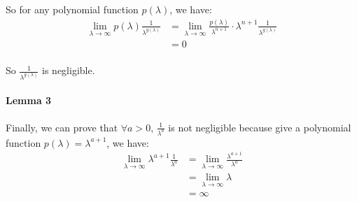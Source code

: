 \documentclass[a4paper,12pt]{article}
\begin{document}
So for any polynomial function $p(\lambda)$, we have:
\begin{equation}
    \begin{aligned}
        \lim_{\lambda \to \infty}p(\lambda)\frac{1}{\lambda^{g(\lambda)}} & = \lim_{\lambda \to \infty}\frac{p(\lambda)}{\lambda^{n + 1}}\cdot \lambda^{n + 1}\frac{1}{\lambda^{g(\lambda)}} \\
                                                                          & = 0                                                                                                              \\
    \end{aligned}
\end{equation}

So $\frac{1}{\lambda^{g(\lambda)}}$ is negligible.

\paragraph*{Lemma 3}
Finally, we can prove that $\forall a > 0$, $\frac{1}{\lambda^a}$ is not negligible because give a polynomial function $p(\lambda) = \lambda^{a + 1}$, we have:
\begin{equation}
    \begin{aligned}
        \lim_{\lambda \to \infty}\lambda^{a + 1}\frac{1}{\lambda^a} & = \lim_{\lambda \to \infty}\frac{\lambda^{a + 1}}{\lambda^a} \\
                                                                    & = \lim_{\lambda \to \infty}\lambda                           \\
                                                                    & = \infty                                                     \\
    \end{aligned}
\end{equation}
\end{document}
